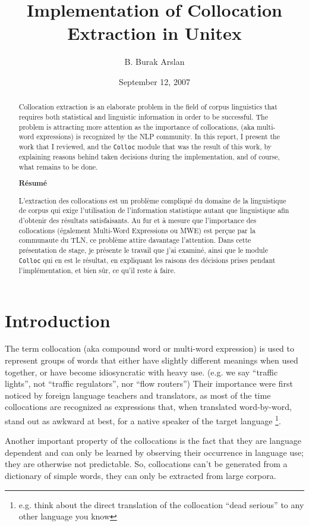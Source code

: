\documentclass[a4paper,12pt,oneside]{article}
\title{Implementation of Collocation Extraction in Unitex}
\author{B. Burak Arslan}
\date{September 12, 2007}
\begin{document}
\maketitle
\begin{abstract}
Collocation extraction is an elaborate problem in the field of corpus linguistics that requires both statistical and linguistic information in order to be successful. The problem is attracting more attention as the importance of collocations, (aka multi-word expressions) is recognized by the NLP community. In this report, I present the work that I reviewed, and the \texttt{Colloc} module that was the result of this work, by explaining reasons behind taken decisions during the implementation, and of course, what remains to be done.

\begin{center}
\textbf{Résumé}
\end{center}

L'extraction des collocations est un problème compliqué du domaine de la linguistique de corpus qui exige l'utilisation de l'information statistique autant que linguistique afin d'obtenir des résultats satisfaisants. Au fur et à mesure que l'importance des collocations (également Multi-Word Expressions ou MWE) est perçue par la communaute du TLN, ce problème attire davantage l'attention. Dans cette présentation de stage, je présente le travail que j'ai examiné, ainsi que le module \texttt{Colloc} qui en est le résultat, en expliquant les raisons des décisions prises pendant l'implémentation, et bien sûr, ce qu'il reste à faire.
\end{abstract}

\section{Introduction}
The term collocation (aka compound word or multi-word expression) is used to represent groups of words that either have slightly different meanings when used together, or have become idiosyncratic with heavy use. 
(e.g. we say ``traffic lights'', not ``traffic regulators'', nor ``flow routers'')
Their importance were first noticed by foreign language teachers and translators, as most of the time collocations are recognized as expressions that, when translated word-by-word, stand out as awkward at best, for a native speaker of the target language
\footnote{e.g. think about the direct translation of the collocation ``dead serious'' to any other language you know}. 

Another important property of the collocations is the fact that they are language dependent and can only be learned by observing their occurrence in language use; they are otherwise not predictable\cite{seretan2003}. So, collocations can't be generated from a dictionary of simple words, they can only be extracted from large corpora.
\end{document}
